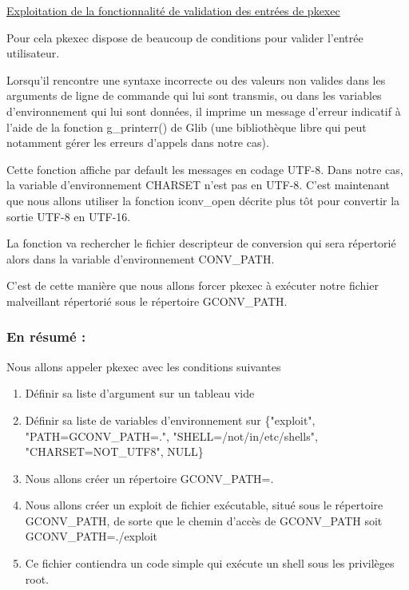 \documentclass[12pt,a4paper]{article}
\begin{document}
\begin{flushleft}
            \item \underline{Exploitation de la fonctionnalité de validation des entrées de pkexec}
            \item Pour cela pkexec dispose de beaucoup de conditions pour valider l'entrée utilisateur.
            \item Lorsqu’il rencontre une syntaxe incorrecte ou des valeurs non valides dans les arguments de ligne de commande qui lui sont transmis, ou dans les variables d’environnement qui lui sont données, il imprime un message d’erreur indicatif à l’aide de la fonction g\_printerr() de Glib (une bibliothèque libre qui peut notamment gérer les erreurs d'appels dans notre cas).
            \item Cette fonction affiche par default les messages en codage UTF-8. Dans notre cas, la variable d'environnement CHARSET n'est pas en UTF-8. C'est maintenant que nous allons utiliser la fonction iconv\_open décrite plus tôt pour convertir la sortie UTF-8 en UTF-16.
            \item La fonction va rechercher le fichier descripteur de conversion qui sera répertorié alors dans la variable d'environnement CONV\_PATH.
            \item C'est de cette manière que nous allons forcer pkexec à exécuter notre fichier malveillant répertorié sous le répertoire GCONV\_PATH.


            \subsubsection{En résumé : }
            \item Nous allons appeler pkexec avec les conditions suivantes
            \begin{enumerate}
                \item Définir sa liste d'argument sur un tableau vide
                \item Définir sa liste de variables d'environnement sur \{"exploit", "PATH=GCONV\_PATH=.", "SHELL=/not/in/etc/shells", "CHARSET=NOT\_UTF8", NULL\}
                \item Nous allons créer un répertoire GCONV\_PATH=.
                \item Nous allons créer un exploit de fichier exécutable, situé sous le répertoire GCONV\_PATH, de sorte que le chemin d'accès de GCONV\_PATH soit GCONV\_PATH=./exploit
                \item Ce fichier contiendra un code simple qui exécute un shell sous les privilèges root.
                

\end{enumerate}
\end{flushleft}
\end{document}
